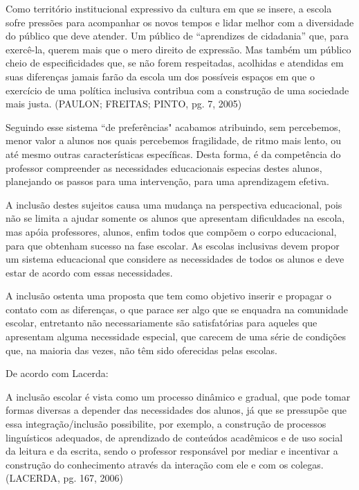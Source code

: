 \documentclass[brasil]{abnt}
\begin{document}
		\begin{citacao}Como território institucional expressivo da cultura em que se insere, a escola sofre pressões para acompanhar os novos tempos e lidar melhor com a diversidade do público que deve atender. 
						Um público de “aprendizes de cidadania” que, para exercê-la, querem mais que o mero direito de expressão. Mas também um público cheio de especificidades que, se não forem respeitadas, 
						acolhidas e atendidas em suas diferenças jamais farão da escola um dos possíveis espaços em que o exercício de uma política inclusiva contribua com a construção de uma sociedade mais justa. 
						(PAULON; FREITAS; PINTO, pg. 7, 2005)
		\end{citacao}
	
	Seguindo esse sistema “de preferências" acabamos atribuindo, sem percebemos, menor valor a alunos nos quais percebemos fragilidade, de ritmo mais lento, ou até mesmo outras características específicas. 
	Desta forma, é da competência do professor compreender as necessidades educacionais especias destes alunos, planejando os passos para uma intervenção, para uma aprendizagem efetiva.
		
	A inclusão destes sujeitos causa uma mudança na perspectiva educacional, pois não se limita a ajudar somente os alunos que apresentam dificuldades na escola, mas apóia professores, alunos,
	enfim todos que compõem o corpo educacional, para que obtenham sucesso na fase escolar. As escolas inclusivas devem propor um sistema educacional que considere as necessidades de todos os alunos e 
	deve estar de acordo com essas necessidades. 
		
		A inclusão ostenta uma proposta que tem como objetivo inserir e propagar o contato com as diferenças, o que parace ser algo que se enquadra na comunidade escolar, entretanto não necessariamente 
		são satisfatórias para aqueles que apresentam alguma necessidade especial, que carecem de uma série de condições que, na maioria das vezes, não têm sido oferecidas pelas escolas.
		
		De acordo com Lacerda:
		
			\begin{citacao}A inclusão escolar é vista como um processo dinâmico e gradual, que pode tomar formas diversas a depender das necessidades dos alunos, já que se pressupõe que essa integração/inclusão 
							possibilite, por exemplo, a construção de processos linguísticos adequados, de aprendizado de conteúdos acadêmicos e de uso social da leitura e da escrita, sendo o professor 
							responsável por mediar e incentivar a construção do conhecimento através da interação com ele e com os colegas. (LACERDA, pg. 167, 2006)
			\end{citacao}
			
\end{document}
